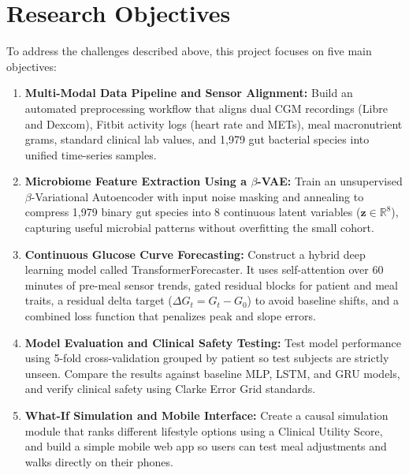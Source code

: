 \section{Research Objectives}
To address the challenges described above, this project focuses on five main objectives:
\begin{enumerate}
    \item \textbf{Multi-Modal Data Pipeline and Sensor Alignment:} Build an automated preprocessing workflow that aligns dual CGM recordings (Libre and Dexcom), Fitbit activity logs (heart rate and METs), meal macronutrient grams, standard clinical lab values, and 1,979 gut bacterial species into unified time-series samples.
    \item \textbf{Microbiome Feature Extraction Using a $\beta$-VAE:} Train an unsupervised $\beta$-Variational Autoencoder with input noise masking and annealing to compress 1,979 binary gut species into 8 continuous latent variables ($\mathbf{z} \in \mathbb{R}^8$), capturing useful microbial patterns without overfitting the small cohort.
    \item \textbf{Continuous Glucose Curve Forecasting:} Construct a hybrid deep learning model called TransformerForecaster. It uses self-attention over 60 minutes of pre-meal sensor trends, gated residual blocks for patient and meal traits, a residual delta target ($\Delta G_t = G_t - G_0$) to avoid baseline shifts, and a combined loss function that penalizes peak and slope errors.
    \item \textbf{Model Evaluation and Clinical Safety Testing:} Test model performance using 5-fold cross-validation grouped by patient so test subjects are strictly unseen. Compare the results against baseline MLP, LSTM, and GRU models, and verify clinical safety using Clarke Error Grid standards.
    \item \textbf{What-If Simulation and Mobile Interface:} Create a causal simulation module that ranks different lifestyle options using a Clinical Utility Score, and build a simple mobile web app so users can test meal adjustments and walks directly on their phones.
\end{enumerate}

